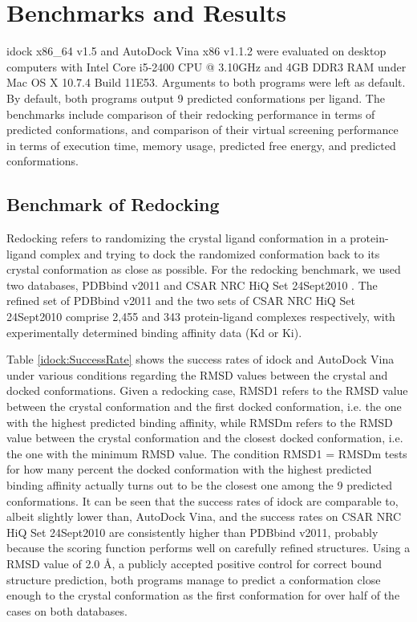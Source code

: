 \section{Benchmarks and Results}

idock x86\_64 v1.5 and AutoDock Vina x86 v1.1.2 were evaluated on desktop computers with Intel Core i5-2400 CPU @ 3.10GHz and 4GB DDR3 RAM under Mac OS X 10.7.4 Build 11E53. Arguments to both programs were left as default. By default, both programs output 9 predicted conformations per ligand. The benchmarks include comparison of their redocking performance in terms of predicted conformations, and comparison of their virtual screening performance in terms of execution time, memory usage, predicted free energy, and predicted conformations.

\subsection{Benchmark of Redocking}

Redocking refers to randomizing the crystal ligand conformation in a protein-ligand complex and trying to dock the randomized conformation back to its crystal conformation as close as possible. For the redocking benchmark, we used two databases, PDBbind v2011 \citep{529,530} and CSAR NRC HiQ Set 24Sept2010 \citep{857,960}. The refined set of PDBbind v2011 and the two sets of CSAR NRC HiQ Set 24Sept2010 comprise 2,455 and 343 protein-ligand complexes respectively, with experimentally determined binding affinity data (Kd or Ki).

Table \ref{idock:SuccessRate} shows the success rates of idock and AutoDock Vina under various conditions regarding the RMSD values between the crystal and docked conformations. Given a redocking case, RMSD1 refers to the RMSD value between the crystal conformation and the first docked conformation, i.e. the one with the highest predicted binding affinity, while RMSDm refers to the RMSD value between the crystal conformation and the closest docked conformation, i.e. the one with the minimum RMSD value. The condition RMSD1 = RMSDm tests for how many percent the docked conformation with the highest predicted binding affinity actually turns out to be the closest one among the 9 predicted conformations. It can be seen that the success rates of idock are comparable to, albeit slightly lower than, AutoDock Vina, and the success rates on CSAR NRC HiQ Set 24Sept2010 are consistently higher than PDBbind v2011, probably because the scoring function performs well on carefully refined structures. Using a RMSD value of 2.0 \AA, a publicly accepted positive control for correct bound structure prediction, both programs manage to predict a conformation close enough to the crystal conformation as the first conformation for over half of the cases on both databases.

